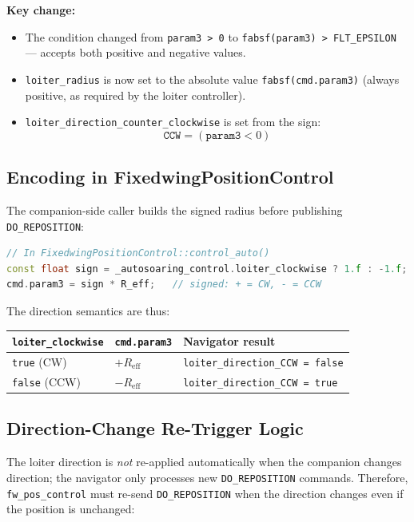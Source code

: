 \documentclass[12pt,a4paper]{article}
\begin{document}
\textbf{Key change:}
\begin{itemize}
  \item The condition changed from \texttt{param3 > 0} to
        \texttt{fabsf(param3) > FLT\_EPSILON} --- accepts both positive
        and negative values.
  \item \texttt{loiter\_radius} is now set to the absolute value
        \texttt{fabsf(cmd.param3)} (always positive, as required by the
        loiter controller).
  \item \texttt{loiter\_direction\_counter\_clockwise} is set from the sign:
        \begin{equation}
          \texttt{CCW} = (\texttt{param3} < 0)
        \end{equation}
\end{itemize}

\subsection{Encoding in FixedwingPositionControl}

The companion-side caller builds the signed radius before publishing
\texttt{DO\_REPOSITION}:

\begin{lstlisting}[language=C++]
// In FixedwingPositionControl::control_auto()
const float sign = _autosoaring_control.loiter_clockwise ? 1.f : -1.f;
cmd.param3 = sign * R_eff;   // signed: + = CW, - = CCW
\end{lstlisting}

The direction semantics are thus:
\begin{center}\begin{tabular}{lll}\toprule
\texttt{loiter\_clockwise} & \texttt{cmd.param3} & Navigator result \\\midrule
\texttt{true} (CW) & $+R_{\text{eff}}$ & \texttt{loiter\_direction\_CCW = false} \\
\texttt{false} (CCW) & $-R_{\text{eff}}$ & \texttt{loiter\_direction\_CCW = true} \\
\bottomrule\end{tabular}\end{center}

\subsection{Direction-Change Re-Trigger Logic}

The loiter direction is \emph{not} re-applied automatically when the
companion changes direction; the navigator only processes new
\texttt{DO\_REPOSITION} commands. Therefore, \texttt{fw\_pos\_control} must
re-send \texttt{DO\_REPOSITION} when the direction changes even if the
position is unchanged:
\end{document}
